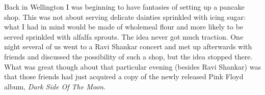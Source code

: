 Back in Wellington I was beginning to have fantasies of setting up a
pancake shop. This was not about serving delicate dainties sprinkled
with icing sugar: what I had in mind would be made of wholemeal flour
and more likely to be served sprinkled with alfalfa sprouts. The idea
never got much traction. One night several of us went to a Ravi Shankar
concert and met up afterwards with friends and discussed the possibility
of such a shop, but the idea stopped there. What was great though about
that particular evening (besides Ravi Shankar) was that those friends
had just acquired a copy of the newly released Pink Floyd album,
\emph{Dark Side Of The Moon}.

